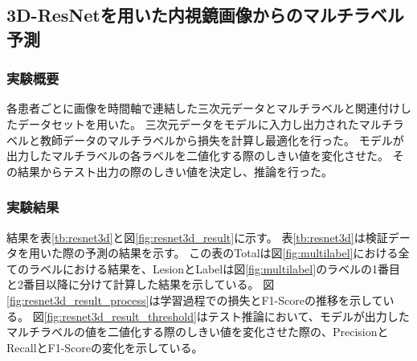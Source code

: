 \subsection{3D-ResNetを用いた内視鏡画像からのマルチラベル予測}
\subsubsection{実験概要}
各患者ごとに画像を時間軸で連結した三次元データとマルチラベルと関連付けしたデータセットを用いた。
三次元データをモデルに入力し出力されたマルチラベルと教師データのマルチラベルから損失を計算し最適化を行った。
モデルが出力したマルチラベルの各ラベルを二値化する際のしきい値を変化させた。
その結果からテスト出力の際のしきい値を決定し、推論を行った。

\subsubsection{実験結果}
結果を表\ref{tb:resnet3d}と図\ref{fig:resnet3d_result}に示す。
表\ref{tb:resnet3d}は検証データを用いた際の予測の結果を示す。
この表のTotalは図\ref{fig:multilabel}における全てのラベルにおける結果を、LesionとLabelは図\ref{fig:multilabel}のラベルの1番目と2番目以降に分けて計算した結果を示している。
図\ref{fig:resnet3d_result_process}は学習過程での損失とF1-Scoreの推移を示している。
図\ref{fig:resnet3d_result_threshold}はテスト推論において、モデルが出力したマルチラベルの値を二値化する際のしきい値を変化させた際の、PrecisionとRecallとF1-Scoreの変化を示している。

